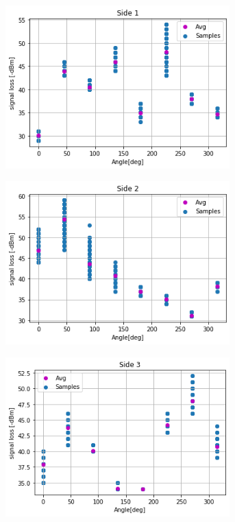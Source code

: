 \begin{figure}[H]
    \centering
    \begin{subfigure}{0.50\textwidth}
        \centering
        \includegraphics[width=0.95\textwidth]{figs/img/Side1_Data.png}
        \label{fig:Side1Dat}
    \end{subfigure}%
    \begin{subfigure}{0.50\textwidth}
        \centering
        \includegraphics[width=0.95\textwidth]{figs/img/Side2_Data.png}
        \label{fig:Side2Dat}
    \end{subfigure}
        \begin{subfigure}{0.50\textwidth}
        \centering
        \includegraphics[width=0.95\textwidth]{figs/img/Side3_Data.png}

\end{subfigure}
\end{figure}
